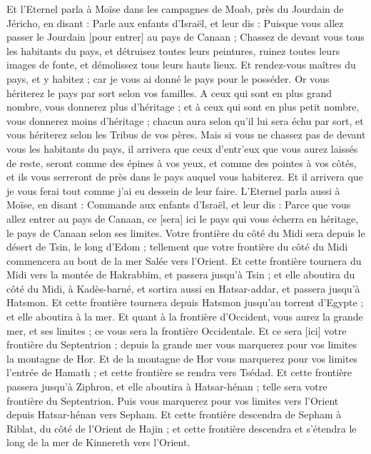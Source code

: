 \begin{multicols}{2}
Et l'Eternel parla à Moïse dans les campagnes de Moab, près du Jourdain de Jéricho, en disant :
Parle aux enfants d'Israël, et leur dis : Puisque vous allez passer le Jourdain [pour entrer] au pays de Canaan ;
Chassez de devant vous tous les habitants du pays, et détruisez toutes leurs peintures, ruinez toutes leurs images de fonte, et démolissez tous leurs hauts lieux.
Et rendez-vous maîtres du pays, et y habitez ; car je vous ai donné le pays pour le posséder.
Or vous hériterez le pays par sort selon vos familles. A ceux qui sont en plus grand nombre, vous donnerez plus d'héritage ; et à ceux qui sont en plus petit nombre, vous donnerez moins d'héritage ; chacun aura selon qu'il lui sera échu par sort, et vous hériterez selon les Tribus de vos pères.
Mais si vous ne chassez pas de devant vous les habitants du pays, il arrivera que ceux d'entr'eux que vous aurez laissés de reste, seront comme des épines à vos yeux, et comme des pointes à vos côtés, et ils vous serreront de près dans le pays auquel vous habiterez.
Et il arrivera que je vous ferai tout comme j'ai eu dessein de leur faire.
\VerseOne{}L'Eternel parla aussi à Moïse, en disant :
Commande aux enfants d'Israël, et leur dis : Parce que vous allez entrer au pays de Canaan, ce [sera] ici le pays qui vous écherra en héritage, le pays de Canaan selon ses limites.
Votre frontière du côté du Midi sera depuis le désert de Tsin, le long d'Edom ; tellement que votre frontière du côté du Midi commencera au bout de la mer Salée vers l'Orient.
Et cette frontière tournera du Midi vers la montée de Hakrabbim, et passera jusqu'à Tsin ; et elle aboutira du côté du Midi, à Kadès-barné, et sortira aussi en Hatsar-addar, et passera jusqu'à Hatsmon.
Et cette frontière tournera depuis Hatsmon jusqu'au torrent d'Egypte ; et elle aboutira à la mer.
Et quant à la frontière d'Occident, vous aurez la grande mer, et ses limites ; ce vous sera la frontière Occidentale.
Et ce sera [ici] votre frontière du Septentrion ; depuis la grande mer vous marquerez pour vos limites la montagne de Hor.
Et de la montagne de Hor vous marquerez pour vos limites l'entrée de Hamath ; et cette frontière se rendra vers Tsédad.
Et cette frontière passera jusqu'à Ziphron, et elle aboutira à Hatsar-hénan ; telle sera votre frontière du Septentrion.
Puis vous marquerez pour vos limites vers l'Orient depuis Hatsar-hénan vers Sepham.
Et cette frontière descendra de Sepham à Riblat, du côté de l'Orient de Hajin ; et cette frontière descendra et s'étendra le long de la mer de Kinnereth vers l'Orient.

\end{multicols}
